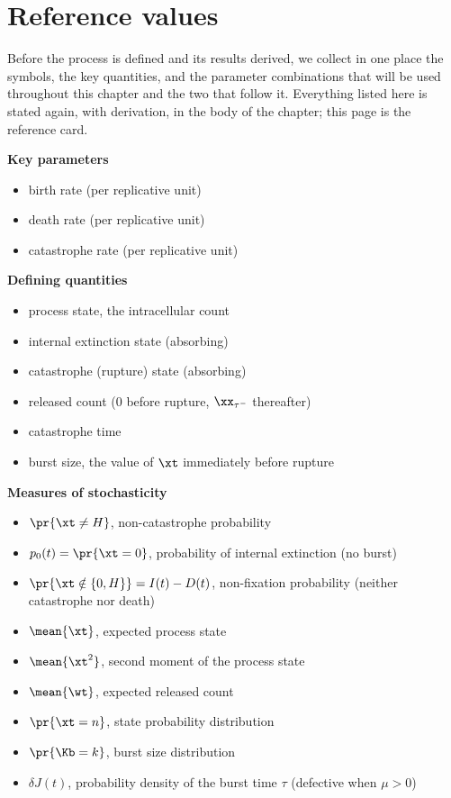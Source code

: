\section{Reference values}
\label{sec:reference}

Before the process is defined and its results derived, we collect in one place
the symbols, the key quantities, and the parameter combinations that will be
used throughout this chapter and the two that follow it. Everything listed here
is stated again, with derivation, in the body of the chapter; this page is the
reference card.

\newcommand\indentA{3cm}

\noindent
\textbf{Key parameters}
\begin{itemize}[leftmargin=\indentA]
\item[$\lambda$ :]birth rate (per replicative unit)
\item[$\mu$ :]death rate (per replicative unit)
\item[$\delta$ :]catastrophe rate (per replicative unit)
\end{itemize}

\noindent
\textbf{Defining quantities}
\begin{itemize}[leftmargin=\indentA]
\item[$\xt$ :]process state, the intracellular count
\item[$\xt=0$ :]internal extinction state (absorbing)
\item[$\xt=H$ :]catastrophe (rupture) state (absorbing)
\item[$\wt$ :]released count ($0$ before rupture, $\xx_{\tau^-}$ thereafter)
\item[$\tau$ :] catastrophe time
\item[$\Kb$ :]burst size, the value of $\xt$ immediately before rupture
\end{itemize}

\noindent
\textbf{Measures of stochasticity}
\begin{itemize}[leftmargin=\indentA]
\item[$I(t)$ :]$\pr{\xt\neq H}$, non-catastrophe probability
\item[$D(t)$ :]$p_0(t)=\pr{\xt = 0}$, probability of internal extinction (no burst)
\item[$\Ifix(t)$ :]$\pr{\xt\notin \{0,H\}} = I(t)-D(t)$, non-fixation probability (neither catastrophe nor death)
\item[$J(t)$ :]$\mean{\xt}$, expected process state
\item[$K(t)$ :]$\mean{\xt^2}$, second moment of the process state
\item[$V(t)$ :]$\mean{\wt}$, expected released count
\item[$p_n(t)$ :]$\pr{\xt = n}$, state probability distribution
\item[$P_k$ :]$\pr{\Kb = k}$, burst size distribution
\item[$\varphi(t)$ :]$\delta J(t)$, probability density of the burst time $\tau$ (defective when $\mu>0$)
\end{itemize}

